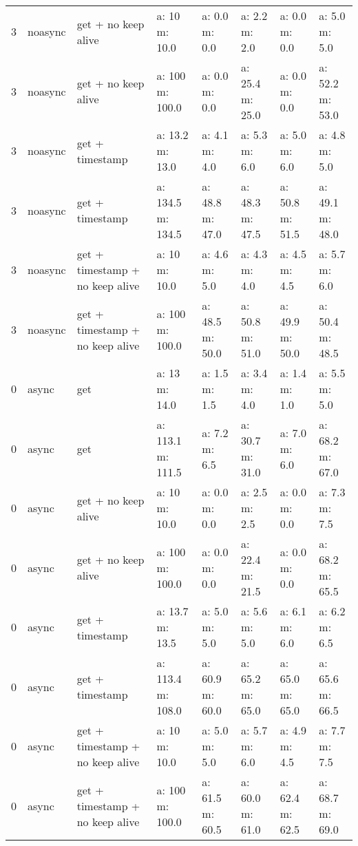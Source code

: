 \documentclass[a4paper]{report}
\begin{document}
\begin{table}[]
\begin{tabular}{l l l l|l l l l}
		3         & noasync & get + no keep alive             & a: 10 m: 10.0     & a: 0.0 m: 0.0   & a: 2.2 m: 2.0   & a: 0.0 m: 0.0   & a: 5.0 m: 5.0   \\
		3         & noasync & get + no keep alive             & a: 100 m: 100.0   & a: 0.0 m: 0.0   & a: 25.4 m: 25.0 & a: 0.0 m: 0.0   & a: 52.2 m: 53.0 \\
		3         & noasync & get + timestamp                 & a: 13.2 m: 13.0   & a: 4.1 m: 4.0   & a: 5.3 m: 6.0   & a: 5.0 m: 6.0   & a: 4.8 m: 5.0   \\
		3         & noasync & get + timestamp                 & a: 134.5 m: 134.5 & a: 48.8 m: 47.0 & a: 48.3 m: 47.5 & a: 50.8 m: 51.5 & a: 49.1 m: 48.0 \\
		3         & noasync & get + timestamp + no keep alive & a: 10 m: 10.0     & a: 4.6 m: 5.0   & a: 4.3 m: 4.0   & a: 4.5 m: 4.5   & a: 5.7 m: 6.0   \\
		3         & noasync & get + timestamp + no keep alive & a: 100 m: 100.0   & a: 48.5 m: 50.0 & a: 50.8 m: 51.0 & a: 49.9 m: 50.0 & a: 50.4 m: 48.5 \\
		0         & async   & get                             & a: 13 m: 14.0     & a: 1.5 m: 1.5   & a: 3.4 m: 4.0   & a: 1.4 m: 1.0   & a: 5.5 m: 5.0   \\
		0         & async   & get                             & a: 113.1 m: 111.5 & a: 7.2 m: 6.5   & a: 30.7 m: 31.0 & a: 7.0 m: 6.0   & a: 68.2 m: 67.0 \\
		0         & async   & get + no keep alive             & a: 10 m: 10.0     & a: 0.0 m: 0.0   & a: 2.5 m: 2.5   & a: 0.0 m: 0.0   & a: 7.3 m: 7.5   \\
		0         & async   & get + no keep alive             & a: 100 m: 100.0   & a: 0.0 m: 0.0   & a: 22.4 m: 21.5 & a: 0.0 m: 0.0   & a: 68.2 m: 65.5 \\
		0         & async   & get + timestamp                 & a: 13.7 m: 13.5   & a: 5.0 m: 5.0   & a: 5.6 m: 5.0   & a: 6.1 m: 6.0   & a: 6.2 m: 6.5   \\
		0         & async   & get + timestamp                 & a: 113.4 m: 108.0 & a: 60.9 m: 60.0 & a: 65.2 m: 65.0 & a: 65.0 m: 65.0 & a: 65.6 m: 66.5 \\
		0         & async   & get + timestamp + no keep alive & a: 10 m: 10.0     & a: 5.0 m: 5.0   & a: 5.7 m: 6.0   & a: 4.9 m: 4.5   & a: 7.7 m: 7.5   \\
		0         & async   & get + timestamp + no keep alive & a: 100 m: 100.0   & a: 61.5 m: 60.5 & a: 60.0 m: 61.0 & a: 62.4 m: 62.5 & a: 68.7 m: 69.0 \\

\end{tabular}
\end{table}
\end{document}
